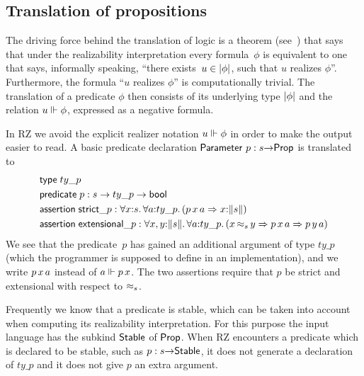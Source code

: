 \subsection{Translation of propositions}
\label{sec:transl-prop}

The driving force behind the translation of logic is a theorem 
(see\ \cite[Thm.~4.4.10]{Troelstra:van-Dalen:88:1}) that says that
under the realizability interpretation every formula~$\phi$ is
equivalent to one that says, informally speaking, ``there exists~$u
\in |\phi|$, such that $u$ realizes $\phi$''. Furthermore, the
formula ``$u$ realizes $\phi$'' is computationally trivial. The
translation of a predicate $\phi$ then consists of its underlying type
$|\phi|$ and the relation $u \Vdash \phi$, expressed as a negative
formula.

In RZ we avoid the explicit realizer notation $u \Vdash \phi$ in order to
make the output easier to read. A basic predicate declaration
$\mathsf{Parameter}\ p : s{\to}\mathsf{Prop}$ is translated to
%
\begin{align*}
  & \otyspec{ty\_p} \\
  & \opropspec{p}{s \to ty\_p \to \oProp} \\
  & \oassertion{\mathsf{strict}\_p}{
    \oforall{x}{s}{
      \oforall{a}{ty\_p}{
        (\oimply
        {\oapp{\oapp{p}{x}}{a}}
        {\ototal{x}{s}
        })
      }
    }
  } \\
  & \oassertion{\mathsf{extensional}\_p}{
    \oforallt{x,y}{s}{
      \oforall{a}{ty\_p}{
          (\oimply{\oper{s}{x}{y}}
          {\oimply{\oapp{\oapp{p}{x}}{a}}{\oapp{\oapp{p}{y}}{a}}})
          }}}
\end{align*}
%
We see that the predicate~$p$ has gained an additional argument of
type $ty\_p$ (which the programmer is supposed to define in an
implementation), and we write $p\,x\,a$ instead of $a
\Vdash p\,x$. The two assertions require that $p$ be strict and
extensional with respect to $\approx_s$.


Frequently we know that a predicate is stable, which can be taken into
account when computing its realizability interpretation. For this
purpose the input language has the subkind $\mathsf{Stable}$ of $\mathsf{Prop}$.
When RZ encounters a predicate which is declared to be stable, such as
$p : s{\to}\mathsf{Stable}$, it does not generate a declaration of
$ty\_p$ and it does not give $p$ an extra argument.

